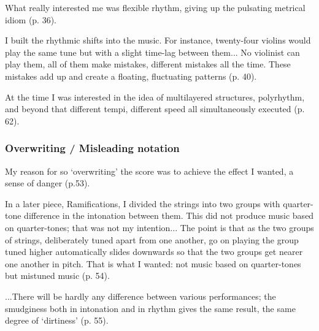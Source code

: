 \documentclass[a4paper,11pt]{article}
\newenvironment{MyShadequote}[1][]{%
    \ignorespaces%
    \begin{mdframed}[style=MyShadeQuoteStyle,#1]%
}{%
    \end{mdframed}%
    \ignorespacesafterend%
}%
\begin{document}
\begin{MyShadequote}
  What really interested me was flexible rhythm, giving up the pulsating metrical idiom (p. 36).
\end{MyShadequote}

\begin{MyShadequote}
  I built the rhythmic shifts into the music.
  For instance, twenty-four violins would play the same tune but with a slight time-lag between them...
  No violinist can play them, all of them make mistakes, different mistakes all the time.
  These mistakes add up and create a floating, fluctuating patterns (p. 40).
\end{MyShadequote}

\begin{MyShadequote}
  At the time I was interested in the idea of multilayered structures, polyrhythm, and beyond that different tempi, different speed all simultaneously executed (p. 62).
\end{MyShadequote}

\subsubsection{Overwriting / Misleading notation}
\label{subs:ligeti:overwriting}

\begin{MyShadequote}
  My reason for so `overwriting' the score was to achieve the effect I wanted, a sense of danger (p.53).
\end{MyShadequote}

\begin{MyShadequote}
  In a later piece, Ramifications, I divided the strings into two groups with quarter-tone difference in the intonation between them.
  This did not produce music based on quarter-tones; that was not my intention...
  The point is that as the two groups of strings, deliberately tuned apart from one another, go on playing the group tuned higher automatically slides downwards so that the two groups get nearer one another in pitch.
  That is what I wanted: not music based on quarter-tones but mistuned music (p. 54).
\end{MyShadequote}

\begin{MyShadequote}
  ...There will be hardly any difference between various performances; the smudginess both in intonation and in rhythm gives the same result, the same degree of ‘dirtiness’ (p. 55).
\end{MyShadequote}
\end{document}
